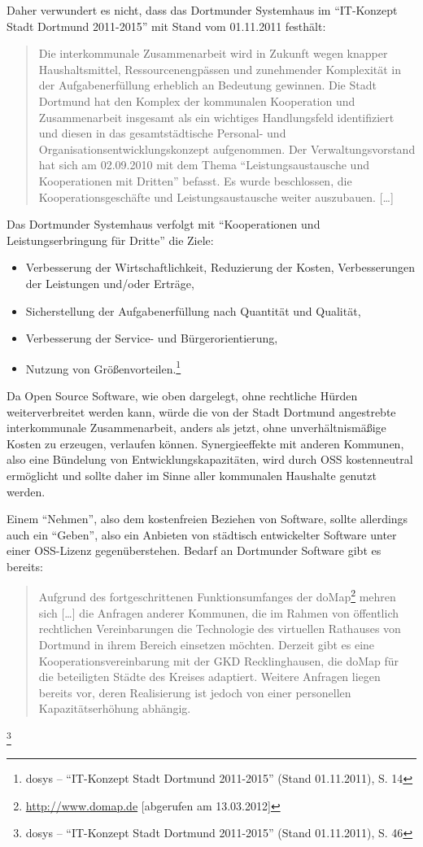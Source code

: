 \documentclass[a4paper]{scrartcl}
\begin{document}
Daher verwundert es nicht, dass das Dortmunder Systemhaus im
``IT-Konzept Stadt Dortmund 2011-2015''
mit Stand vom 01.11.2011 festhält:
\begin{quote}Die interkommunale Zusammenarbeit wird in Zukunft wegen knapper
  Haushaltsmittel, Ressourcenengpässen und zunehmender Komplexität in der
  Aufgabenerfüllung erheblich an Bedeutung gewinnen. Die Stadt Dortmund hat den
  Komplex der kommunalen Kooperation und Zusammenarbeit insgesamt als ein
  wichtiges Handlungsfeld identifiziert und diesen in das gesamtstädtische
  Personal- und Organisationsentwicklungskonzept aufgenommen. Der
  Verwaltungsvorstand hat sich am 02.09.2010 mit dem Thema ``Leistungsaustausche
  und Kooperationen mit Dritten'' befasst. Es wurde beschlossen, die
  Kooperationsgeschäfte und Leistungsaustausche weiter
  auszubauen. [\ldots] \end{quote}

Das Dortmunder Systemhaus verfolgt mit ``Kooperationen und Leistungserbringung
für Dritte'' die Ziele:

\begin{itemize}
\item Verbesserung der Wirtschaftlichkeit, Reduzierung der Kosten,
Verbesserungen der Leistungen und/oder Erträge,
\item Sicherstellung der Aufgabenerfüllung nach Quantität und Qualität,
\item Verbesserung der Service- und Bürgerorientierung,
\item Nutzung von Größenvorteilen.\footnote{dosys --
``IT-Konzept Stadt Dortmund 2011-2015''
(Stand 01.11.2011), S. 14}
\end{itemize}

Da Open Source Software, wie oben dargelegt, ohne rechtliche Hürden
weiterverbreitet werden kann, würde die von der Stadt Dortmund
angestrebte interkommunale Zusammenarbeit, anders als jetzt, ohne
unverhältnismäßige Kosten zu erzeugen, verlaufen können.
Synergieeffekte mit anderen Kommunen, also eine Bündelung von
Entwicklungskapazitäten, wird durch OSS kostenneutral ermöglicht
und sollte daher im Sinne aller kommunalen Haushalte genutzt werden.

Einem ``Nehmen'', also dem kostenfreien
Beziehen von Software, sollte allerdings auch ein
``Geben'', also ein Anbieten von
städtisch entwickelter Software unter einer OSS-Lizenz
gegenüberstehen. Bedarf an Dortmunder Software gibt es bereits:
\begin{quote}Aufgrund des fortgeschrittenen Funktionsumfanges der
  doMap\footnote{\href{http://www.domap.de/}{{http://www.domap.de}} [abgerufen
    am 13.03.2012]} mehren sich [\ldots] die Anfragen anderer Kommunen, die im
  Rahmen von öffentlich rechtlichen Vereinbarungen die Technologie des
  virtuellen Rathauses von Dortmund in ihrem Bereich einsetzen möchten. Derzeit
  gibt es eine Kooperationsvereinbarung mit der GKD Recklinghausen, die doMap
  für die beteiligten Städte des Kreises adaptiert. Weitere Anfragen liegen
  bereits vor, deren Realisierung ist jedoch von einer personellen
  Kapazitätserhöhung abhängig.
\end{quote}\footnote{dosys --
``IT-Konzept Stadt Dortmund 2011-2015''
(Stand 01.11.2011), S. 46}
\end{document}
